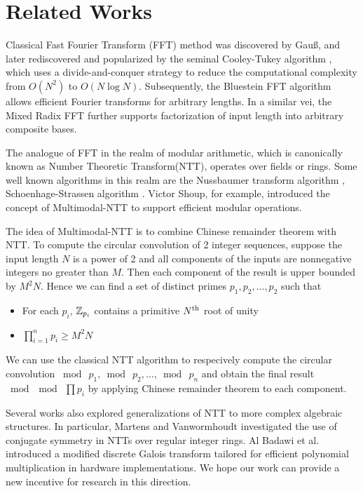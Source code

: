 \section{Related Works} \label{section:relatedWork}
Classical Fast Fourier Transform (FFT) method was discovered by Gau{\ss}, and later rediscovered and popularized by the seminal Cooley-Tukey algorithm \cite{JSTOR:Cooley65,IEEE:Cooley67}, which uses a divide-and-conquer strategy to reduce the computational complexity from  \(O(N^2)\) to \(O(N \log N)\). Subsequently, the Bluestein FFT algorithm \cite{IEEE:Bluestein70} allows efficient Fourier transforms for arbitrary lengths. In a similar vei, the Mixed Radix FFT \cite{PNCC:ASCJ74} further supports  factorization of input length into arbitrary composite bases.

The analogue of FFT in the realm of modular arithmetic, which is canonically known as Number Theoretic Transform(NTT), operates over fields or rings. Some well known algorithms in this realm are the Nussbaumer transform algorithm \cite{IEEE:NussHen80}, Schoenhage-Strassen algorithm \cite{COMP:ShoeStra71}. Victor Shoup, for example, introduced the concept of Multimodal-NTT \cite{JSC:Shoup95} to support efficient modular operations.

The idea of Multimodal-NTT is to combine Chinese remainder theorem with NTT. To compute the circular convolution of 2 integer sequences, suppose the input length \(N\) is a power of 2 and all components of the inputs are nonnegative integers no greater than \(M\). Then each component of the result is upper bounded by \(M^2 N\). Hence we can find a set of distinct primes \(p_1, p_2, \ldots, p_2\) such that
\begin{itemize}
    \item For each \(p_i\), \(\mathbb{Z}_{p_i}\) contains a primitive \(N\textsuperscript{th}\) root of unity
    \item \(\prod_{i=1}^{n} p_i \ge M^2 N\)
\end{itemize}
We can use the classical NTT algorithm to respecively compute the circular convolution \(\bmod \  p_1, \bmod \  p_2, \ldots , \bmod \  p_n\) and obtain the final result \(\bmod \bmod \  \prod p_i\) by applying Chinese remainder theorem to each component.

Several works also explored generalizations of NTT to more complex algebraic structures. In particular, Martens and Vanwormhoudt \cite{IEEE:MartVan83} investigated the use of conjugate symmetry in NTTs over regular integer rings. Al Badawi et al. \cite{FICC:AAVBA19} introduced a modified discrete Galois transform tailored for efficient polynomial multiplication in hardware implementations. We hope our work can provide a new incentive for research in this direction.